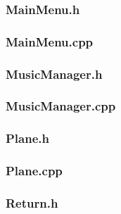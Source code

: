 \documentclass{article}
\begin{document}
\subsubsection{MainMenu.h}
	

\subsubsection{MainMenu.cpp}
		 
 				
\subsubsection{MusicManager.h}
	
	 				
\subsubsection{MusicManager.cpp}
	
	 				
\subsubsection{Plane.h}
	
	 				
\subsubsection{Plane.cpp}
	
	 			
\subsubsection{Return.h}
	
	 				
\end{document}
